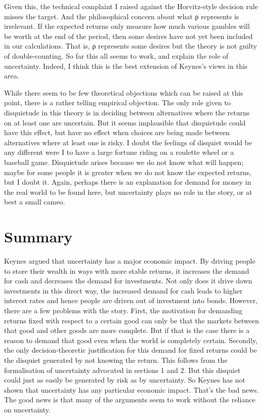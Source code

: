 \documentclass[
  10pt,
  letterpaper,
  DIV=11,
  numbers=noendperiod,
  twoside]{scrartcl}
\begin{document}
Given this, the technical complaint I raised against the Horvitz-style
decision rule misses the target. And the philosophical concern about
what ρ represents is irrelevant. If the expected returns only measure
how much various gambles will be worth at the end of the period, then
some desires have not yet been included in our calculations. That is, ρ
represents some desires but the theory is not guilty of double-counting.
So far this all seems to work, and explain the role of uncertainty.
Indeed, I think this is the best extension of Keynes's views in this
area.

While there seem to be few theoretical objections which can be raised at
this point, there is a rather telling empirical objection. The only role
given to disquietude in this theory is in deciding between alternatives
where the returns on at least one are uncertain. But it seems
implausible that disquietude could have this effect, but have no effect
when choices are being made between alternatives where at least one is
risky. I doubt the feelings of disquiet would be any different were I to
have a large fortune riding on a roulette wheel or a baseball game.
Disquietude arises because we do not know what will happen; maybe for
some people it is greater when we do not know the expected returns, but
I doubt it. Again, perhaps there is an explanation for demand for money
in the real world to be found here, but uncertainty plays no role in the
story, or at best a small cameo.

\section{Summary}\label{summary}

Keynes argued that uncertainty has a major economic impact. By driving
people to store their wealth in ways with more stable returns, it
increases the demand for cash and decreases the demand for investments.
Not only does it drive down investments in this direct way, the
increased demand for cash leads to higher interest rates and hence
people are driven out of investment into bonds. However, there are a few
problems with the story. First, the motivation for demanding returns
fixed with respect to a certain good can only be that the markets
between that good and other goods are more complete. But if that is the
case there is a reason to demand that good even when the world is
completely certain. Secondly, the only decision-theoretic justification
for this demand for fixed returns could be the disquiet generated by not
knowing the return. This follows from the formalisation of uncertainty
advocated in sections 1 and 2. But this disquiet could just as easily be
generated by risk as by uncertainty. So Keynes has not shown that
uncertainty has any particular economic impact. That's the bad news. The
good news is that many of the arguments seem to work without the
reliance on uncertainty.
\end{document}
